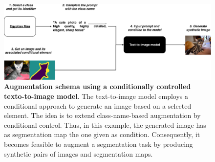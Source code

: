 \begin{figure}
    \centering
    \includegraphics[width=1\textwidth]{Pictures/control-augmentation.pdf}
    \caption{\textbf{Augmentation schema using a conditionally controlled texto-to-image model}. The text-to-image model employs a conditional approach to generate an image based on a selected element. The idea is to extend class-name-based augmentation by conditional control. Thus, in this example, the generated image has as segmentation map the one given as condition. Consequently, it becomes feasible to augment a segmentation task by producing synthetic pairs of images and segmentation maps.}
    \label{fig:condaug}
\end{figure}